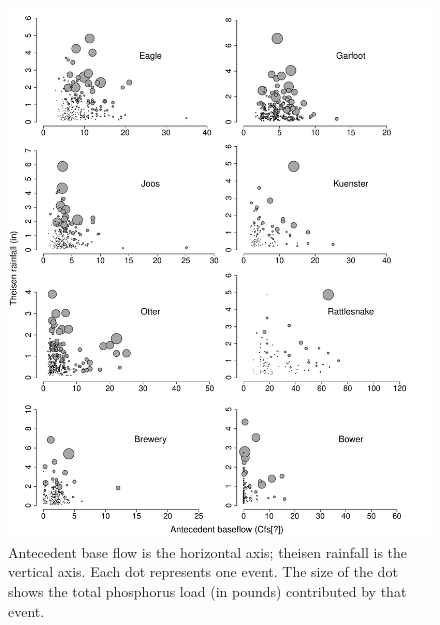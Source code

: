 \documentclass[10pt]{article}
\makeatletter
\def\maxwidth{ %
  \ifdim\Gin@nat@width>\linewidth
    \linewidth
  \else
    \Gin@nat@width
  \fi
}
\newenvironment{knitrout}{}{} %
\makeatother
\begin{document}
\begin{figure}
    \begin{center}
\begin{knitrout}
\color{fgcolor}\includegraphics[width=\maxwidth]{figure/figure5} 
\end{knitrout}

    \end{center}
    \caption{Antecedent base flow is the horizontal axis; theisen rainfall is the vertical axis. Each dot represents one event. The size of the dot shows the total phosphorus load (in pounds) contributed by that event. \label{phos_bubbles}}
\end{figure}







\end{document}
